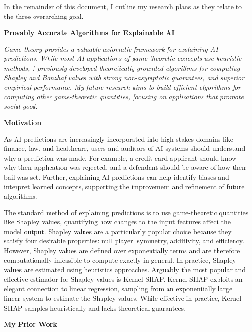 \documentclass[11pt]{article}
\begin{document}
{In the remainder of this document, I outline my research plans as they relate to the three overarching goal.

\begin{center}
{ \large \textbf{Provably Accurate Algorithms for Explainable AI}}
\end{center}

\textit{Game theory provides a valuable axiomatic framework for explaining AI predictions. While most AI applications of game-theoretic concepts use heuristic methods, I previously developed theoretically grounded algorithms for computing Shapley and Banzhaf values with strong non-asymptotic guarantees, and superior empirical performance. My future research aims to build efficient algorithms for computing other game-theoretic quantities, focusing on applications that promote social good.}

{ \large \textbf{Motivation}}

As AI predictions are increasingly incorporated into high-stakes domains like finance, law, and healthcare, users and auditors of AI systems should understand why a prediction was made. For example, a credit card applicant should know why their application was rejected, and a defendant should be aware of how their bail was set. 
Further, explaining AI predictions can help identify biases and interpret learned concepts, supporting the improvement and refinement of future algorithms.

The standard method of explaining predictions is to use game-theoretic quantities like Shapley values, quantifying how changes to the input features affect the model output.
Shapley values are a particularly popular choice because they satisfy four desirable properties: null player, symmetry, additivity, and efficiency.
However, Shapley values are defined over exponentially terms and are therefore computationally infeasible to compute exactly in general.
In practice, Shapley values are estimated using heuristics approaches.
Arguably the most popular and effective estimator for Shapley values is Kernel SHAP.
Kernel SHAP exploits an elegant connection to linear regression, sampling from an exponentially large linear system to estimate the Shapley values.
While effective in practice, Kernel SHAP samples heuristically and lacks theoretical guarantees.

{ \large \textbf{My Prior Work}}

}
\end{document}
